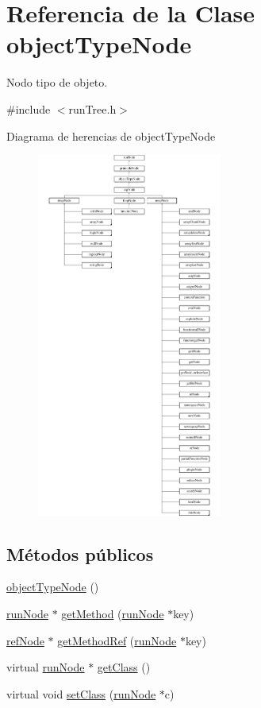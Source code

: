 \hypertarget{classobjectTypeNode}{\section{Referencia de la Clase object\-Type\-Node}
\label{classobjectTypeNode}
}


Nodo tipo de objeto.  




{\ttfamily \#include $<$run\-Tree.\-h$>$}

Diagrama de herencias de object\-Type\-Node\begin{figure}[H]
\begin{center}
\leavevmode
\includegraphics[height=12.000000cm]{classobjectTypeNode}
\end{center}
\end{figure}
\subsection*{Métodos públicos}
\begin{DoxyCompactItemize}
\item 
\hyperlink{classobjectTypeNode_af504d6b0b6801db2b712f7dda3dd342f}{object\-Type\-Node} ()
\item 
\hyperlink{classrunNode}{run\-Node} $\ast$ \hyperlink{classobjectTypeNode_a4c248660eed9ffdd132f075224b82544}{get\-Method} (\hyperlink{classrunNode}{run\-Node} $\ast$key)
\item 
\hyperlink{classrefNode}{ref\-Node} $\ast$ \hyperlink{classobjectTypeNode_a6dbd87c8c646340d2e817c64d94afaf6}{get\-Method\-Ref} (\hyperlink{classrunNode}{run\-Node} $\ast$key)
\item 
virtual \hyperlink{classrunNode}{run\-Node} $\ast$ \hyperlink{classobjectTypeNode_a42d4efaea6b650ef72807de94d3baa37}{get\-Class} ()
\item 
virtual void \hyperlink{classobjectTypeNode_adc36ba9bb3fe82a12c9a50eea11ee94b}{set\-Class} (\hyperlink{classrunNode}{run\-Node} $\ast$c)
\end{DoxyCompactItemize}
